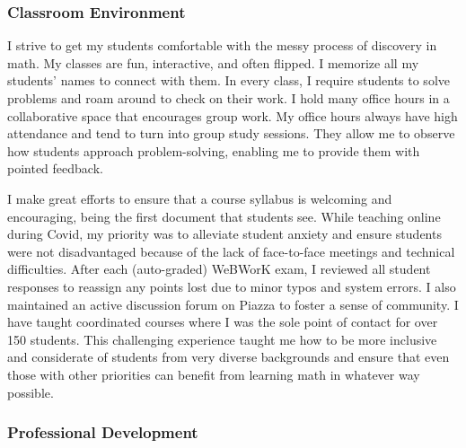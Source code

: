 \documentclass[
]{report}
\begin{document}
\hypertarget{classroom-environment}{%
\subsubsection*{Classroom Environment}\label{classroom-environment}}


I strive to get my students comfortable with the messy process of discovery in math.
My classes are fun, interactive, and often flipped.
I memorize all my students' names to connect with them.
In every class, I require students to solve problems and roam around to check on their work.
I hold many office hours in a collaborative space that encourages group work. My office hours always have high attendance and tend to turn into group study sessions.
They allow me to observe how students approach problem-solving, enabling me to provide them with pointed feedback.

I make great efforts to ensure that a course syllabus is welcoming and encouraging, being the first document that students see. While teaching online during Covid, my priority was to alleviate student anxiety and ensure students were not disadvantaged because of the lack of face-to-face meetings and technical difficulties. After each (auto-graded) WeBWorK exam, I reviewed all student responses to reassign any points lost due to minor typos and system errors. I also maintained an active discussion forum on Piazza to foster a sense of community. I have taught coordinated courses where I was the sole point of contact for over 150 students. This challenging experience taught me how to be more inclusive and considerate of students from very diverse backgrounds and ensure that even those with other priorities can benefit from learning math in whatever way possible.

\hypertarget{professional-development}{%
\subsubsection*{Professional Development}\label{professional-development}}
\end{document}
